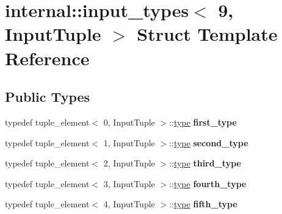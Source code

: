 \hypertarget{structinternal_1_1input__types_3_019_00_01InputTuple_01_4}{}\section{internal\+:\+:input\+\_\+types$<$ 9, Input\+Tuple $>$ Struct Template Reference}
\label{structinternal_1_1input__types_3_019_00_01InputTuple_01_4}
\subsection*{Public Types}
\begin{DoxyCompactItemize}
\item 
\hypertarget{structinternal_1_1input__types_3_019_00_01InputTuple_01_4_afbbab6065569c3a37deb6a2022d9cec6}{}typedef tuple\+\_\+element$<$ 0, Input\+Tuple $>$\+::\hyperlink{classinternal_1_1tagged__msg}{type} {\bfseries first\+\_\+type}\label{structinternal_1_1input__types_3_019_00_01InputTuple_01_4_afbbab6065569c3a37deb6a2022d9cec6}

\item 
\hypertarget{structinternal_1_1input__types_3_019_00_01InputTuple_01_4_a8dc3a6e07a1468a5f0178b14c2af6ac1}{}typedef tuple\+\_\+element$<$ 1, Input\+Tuple $>$\+::\hyperlink{classinternal_1_1tagged__msg}{type} {\bfseries second\+\_\+type}\label{structinternal_1_1input__types_3_019_00_01InputTuple_01_4_a8dc3a6e07a1468a5f0178b14c2af6ac1}

\item 
\hypertarget{structinternal_1_1input__types_3_019_00_01InputTuple_01_4_ab4d530c0509ad0c1dca1141aa2c750f1}{}typedef tuple\+\_\+element$<$ 2, Input\+Tuple $>$\+::\hyperlink{classinternal_1_1tagged__msg}{type} {\bfseries third\+\_\+type}\label{structinternal_1_1input__types_3_019_00_01InputTuple_01_4_ab4d530c0509ad0c1dca1141aa2c750f1}

\item 
\hypertarget{structinternal_1_1input__types_3_019_00_01InputTuple_01_4_ad46cd720240cc2daaa4cbaf76b8d5871}{}typedef tuple\+\_\+element$<$ 3, Input\+Tuple $>$\+::\hyperlink{classinternal_1_1tagged__msg}{type} {\bfseries fourth\+\_\+type}\label{structinternal_1_1input__types_3_019_00_01InputTuple_01_4_ad46cd720240cc2daaa4cbaf76b8d5871}

\item 
\hypertarget{structinternal_1_1input__types_3_019_00_01InputTuple_01_4_adf4442b04ae57868a9a12ff4178016c6}{}typedef tuple\+\_\+element$<$ 4, Input\+Tuple $>$\+::\hyperlink{classinternal_1_1tagged__msg}{type} {\bfseries fifth\+\_\+type}\label{structinternal_1_1input__types_3_019_00_01InputTuple_01_4_adf4442b04ae57868a9a12ff4178016c6}


\end{DoxyCompactItemize}
